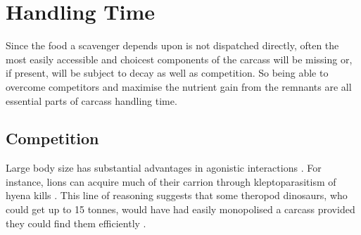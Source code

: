 \documentclass[a4paper,12pt]{article}
\begin{document}







\section*{Handling Time}
Since the food a scavenger depends upon is not dispatched directly, often the most easily accessible and choicest components of the carcass will be missing or, if present, will be subject to decay as well as competition.
So being able to overcome competitors and maximise the nutrient gain from the remnants are all essential parts of carcass handling time. 

\subsection*{Competition}
Large body size has substantial advantages in agonistic interactions \citep{ruxton2004obligate}. 
For instance, lions can acquire much of their carrion through kleptoparasitism of hyena kills \citep{trinkel2005competitive}. 
This line of reasoning suggests that some theropod dinosaurs, who could get up to 15 tonnes, would have had easily monopolised a carcass \citep{weishampel2004dinosauria} provided they could find them efficiently \citep{kane2016body}. 
\end{document}
